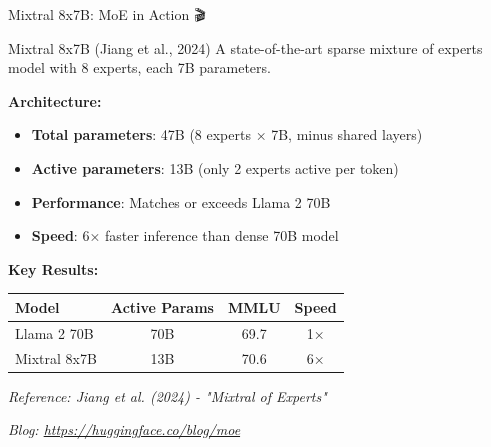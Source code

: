 \documentclass[aspectratio=169]{beamer}
\begin{document}
\begin{frame}{Mixtral 8x7B: MoE in Action 🎬}
\begin{block}{Mixtral 8x7B (Jiang et al., 2024)}
A state-of-the-art sparse mixture of experts model with 8 experts, each 7B parameters.
\end{block}

\vspace{0.5em}

\textbf{Architecture:}
\begin{itemize}\setlength{\itemsep}{0pt}
    \item \textbf{Total parameters}: 47B (8 experts × 7B, minus shared layers)
    \item \textbf{Active parameters}: 13B (only 2 experts active per token)
    \item \textbf{Performance}: Matches or exceeds Llama 2 70B
    \item \textbf{Speed}: 6× faster inference than dense 70B model
\end{itemize}

\vspace{0.5em}

\textbf{Key Results:}
\begin{table}
\tiny
\begin{tabular}{l c c c}
\toprule
\textbf{Model} & \textbf{Active Params} & \textbf{MMLU} & \textbf{Speed} \\
\midrule
Llama 2 70B & 70B & 69.7 & 1× \\
Mixtral 8x7B & 13B & 70.6 & 6× \\
\bottomrule
\end{tabular}
\end{table}

\vspace{0.5em}
\small
\textit{Reference: Jiang et al. (2024) - "Mixtral of Experts"}

\textit{Blog: \url{https://huggingface.co/blog/moe}}
\end{frame}
\end{document}
